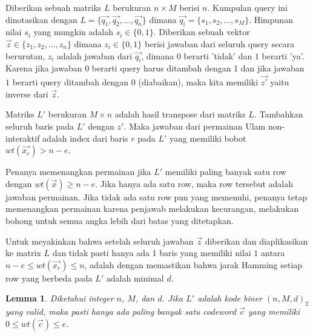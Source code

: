 \documentclass[conference,compsoc]{IEEEtran}
\newtheorem{lemma}[theorem]{Lemma}
\begin{document}
Diberikan sebuah matriks $L$ berukuran $n \times M$ berisi $n$. Kumpulan query ini dinotasikan dengan $L = \{\vec{q_1},\vec{q_2},\ldots,\vec{q_n}\}$ dimana $\vec{q_i} = \{s_1,s_2,\ldots,s_M\}$. Himpunan nilai $s_i$ yang mungkin adalah $s_i \in \{0,1\}$. Diberikan sebuah vektor $\vec{z} \in \{z_1,z_2,\ldots,z_n\}$ dimana $z_i \in \{0,1\}$ berisi jawaban dari seluruh query secara berurutan, $z_i$ adalah jawaban dari $\vec{q_i}$, dimana $0$ berarti 'tidak' dan $1$ berarti 'ya'. Karena jika jawaban $0$ berarti query harus ditambah dengan 1 dan jika jawaban $1$ berarti query ditambah dengan 0 (diabaikan), maka kita memiliki $\vec{z'}$ yaitu inverse dari $\vec{z}$.

Matriks $L'$ berukuran $M \times n$ adalah hasil transpose dari matriks $L$. Tambahkan seluruh baris pada $L'$ dengan $z'$. Maka jawaban dari permainan Ulam non-interaktif adalah index dari baris $r$ pada $L'$ yang memiliki bobot $wt(\vec{x_r}) > n-e$.

Penanya memenangkan permainan jika $L'$ memiliki paling banyak satu row dengan $wt(\vec{x}) \ge n-e$. Jika hanya ada satu row, maka row tersebut adalah jawaban permainan. Jika tidak ada satu row pun yang memenuhi, penanya tetap memenangkan permainan karena penjawab melakukan kecurangan, melakukan bohong untuk semua angka lebih dari batas yang ditetapkan.

Untuk meyakinkan bahwa setelah seluruh jawaban $\vec{z}$ diberikan dan diaplikasikan ke matrix $L$ dan tidak pasti hanya ada 1 baris yang memiliki nilai $1$ antara $n-e \le wt(\vec{x_r}) \le n$, adalah dengan memastikan bahwa jarak Hamming setiap row yang berbeda pada $L'$ adalah minimal $d$.

\begin{lemma}
Diketahui integer $n$, $M$, dan $d$. Jika $L'$ adalah kode biner $(n,M,d)_2$ yang valid, maka pasti hanya ada paling banyak satu codeword $\vec{c}$ yang memiliki $0 \le wt(\vec{c}) \le e$.
\end{lemma}
\end{document}
